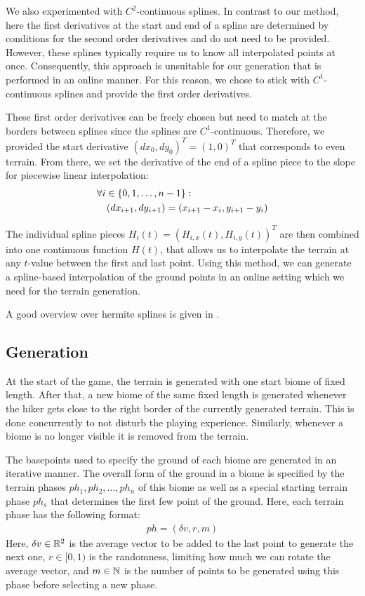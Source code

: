 We also experimented with $C^2$-continuous splines. 
In contrast to our method, here the first derivatives at the start and end of a spline are determined by conditions for the second order derivatives and do not need to be provided.
However, these splines typically require us to know all interpolated points at once. 
Consequently, this approach is unsuitable for our generation that is performed in an online manner.
For this reason, we chose to stick with $C^1$-continuous splines and provide the first order derivatives. 

These first order derivatives can be freely chosen but need to match at the borders between splines since the splines are $C^1$-continuous.
Therefore, we provided the start derivative $(dx_0, dy_0)^T = (1, 0)^T$ that corresponds to even terrain. 
From there, we set the derivative of the end of a spline piece to the slope for piecewise linear interpolation:
\begin{align}
  & \forall i\in\{0,1, \dots, n-1\}: \notag\\
  & \quad (dx_{i+1}, dy_{i+1}) = (x_{i+1} - x_i, y_{i+1} - y_i)
\end{align}

The individual spline pieces $H_i(t) = (H_{i, x}(t), H_{i, y}(t))^T$ are then combined into one continuous function $H(t)$, that allows us to interpolate the terrain at any $t$-value between the first and last point.
Using this method, we can generate a spline-based interpolation of the ground points in an online setting which we need for the terrain generation.

A good overview over hermite splines is given in \cite{NumerischeGrundlagen2024}.

\subsection{Generation}

At the start of the game, the terrain is generated with one start biome of fixed length. After that, a new biome of the same fixed length is generated whenever the hiker gets close to the right border of the currently generated terrain. 
This is done concurrently to not disturb the playing experience.
Similarly, whenever a biome is no longer visible it is removed from the terrain.

The basepoints used to specify the ground of each biome are generated in an iterative manner.
The overall form of the ground in a biome is specified by the terrain phases $ph_1, ph_2, \dots, ph_n$ of this biome as well as a special starting terrain phase $ph_{s}$ that determines the first few point of the ground.
Here, each terrain phase has the following format: 
\begin{align}
  ph = (\delta v, r, m)
\end{align}
Here, $\delta v \in{\mathbb{R}}^2$ is the average vector to be added to the last point to generate the next one, $r \in [0,1)$ is the randomness, limiting how much we can rotate the average vector, and $m \in {\mathbb{N}}$ is the number of points to be generated using this phase before selecting a new phase.

